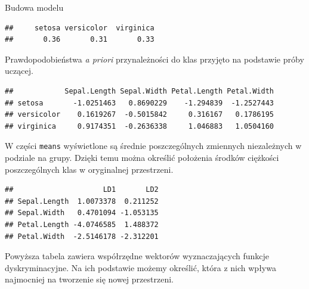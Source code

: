 \documentclass[]{book}
\newenvironment{Shaded}{\begin{snugshade}}{\end{snugshade}}
\newcommand{\DataTypeTok}[1]{\textcolor[rgb]{0.13,0.29,0.53}{#1}}
\newcommand{\KeywordTok}[1]{\textcolor[rgb]{0.13,0.29,0.53}{\textbf{#1}}}
\newcommand{\NormalTok}[1]{#1}
\newcommand{\OperatorTok}[1]{\textcolor[rgb]{0.81,0.36,0.00}{\textbf{#1}}}
\newcommand{\StringTok}[1]{\textcolor[rgb]{0.31,0.60,0.02}{#1}}
\theoremstyle{plain}
\theoremstyle{definition}
\theoremstyle{definition}
\theoremstyle{definition}
\theoremstyle{definition}
\theoremstyle{remark}
\begin{document}
Budowa modelu

\begin{Shaded}
\end{Shaded}

\begin{verbatim}
##     setosa versicolor  virginica 
##       0.36       0.31       0.33
\end{verbatim}

Prawdopodobieństwa \emph{a priori} przynależności do klas przyjęto na podstawie próby uczącej.

\begin{Shaded}
\end{Shaded}

\begin{verbatim}
##            Sepal.Length Sepal.Width Petal.Length Petal.Width
## setosa       -1.0251463   0.8690229    -1.294839  -1.2527443
## versicolor    0.1619267  -0.5015842     0.316167   0.1786195
## virginica     0.9174351  -0.2636338     1.046883   1.0504160
\end{verbatim}

W części \texttt{means} wyświetlone są średnie poszczególnych zmiennych niezależnych w podziale na grupy. Dzięki temu można określić położenia środków ciężkości poszczególnych klas w oryginalnej przestrzeni.

\begin{Shaded}
\end{Shaded}

\begin{verbatim}
##                     LD1       LD2
## Sepal.Length  1.0073378  0.211252
## Sepal.Width   0.4701094 -1.053135
## Petal.Length -4.0746585  1.488372
## Petal.Width  -2.5146178 -2.312201
\end{verbatim}

Powyższa tabela zawiera współrzędne wektorów wyznaczających funkcje dyskryminacyjne. Na ich podstawie możemy określić, która z nich wpływa najmocniej na tworzenie się nowej przestrzeni.
\end{document}
